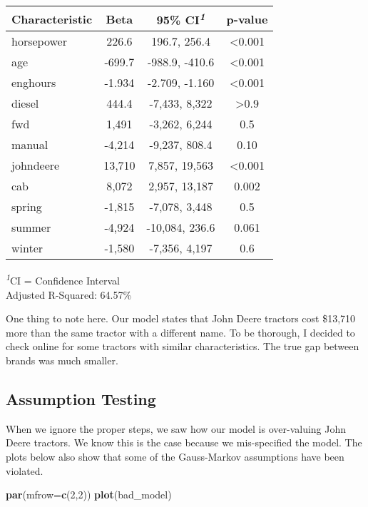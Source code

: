 \documentclass[
]{article}
\newenvironment{Shaded}{\begin{snugshade}}{\end{snugshade}}
\newcommand{\AttributeTok}[1]{\textcolor[rgb]{0.13,0.29,0.53}{#1}}
\newcommand{\DecValTok}[1]{\textcolor[rgb]{0.00,0.00,0.81}{#1}}
\newcommand{\FunctionTok}[1]{\textcolor[rgb]{0.13,0.29,0.53}{\textbf{#1}}}
\newcommand{\NormalTok}[1]{#1}
\begin{document}
\begingroup
\fontsize{12.0pt}{14.4pt}\selectfont
\setlength{\LTpost}{0mm}
\begin{longtable}{lccc}
\toprule
\textbf{Characteristic} & \textbf{Beta} & \textbf{95\% CI}\textsuperscript{\textit{1}} & \textbf{p-value} \\ 
\midrule\addlinespace[2.5pt]
horsepower & 226.6 & 196.7, 256.4 & <0.001 \\ 
age & -699.7 & -988.9, -410.6 & <0.001 \\ 
enghours & -1.934 & -2.709, -1.160 & <0.001 \\ 
diesel & 444.4 & -7,433, 8,322 & >0.9 \\ 
fwd & 1,491 & -3,262, 6,244 & 0.5 \\ 
manual & -4,214 & -9,237, 808.4 & 0.10 \\ 
johndeere & 13,710 & 7,857, 19,563 & <0.001 \\ 
cab & 8,072 & 2,957, 13,187 & 0.002 \\ 
spring & -1,815 & -7,078, 3,448 & 0.5 \\ 
summer & -4,924 & -10,084, 236.6 & 0.061 \\ 
winter & -1,580 & -7,356, 4,197 & 0.6 \\ 
\bottomrule
\end{longtable}
\begin{minipage}{\linewidth}
\textsuperscript{\textit{1}}CI = Confidence Interval\\
Adjusted R-Squared: 64.57\%\\
\end{minipage}
\endgroup

One thing to note here. Our model states that John Deere tractors cost
\$13,710 more than the same tractor with a different name. To be
thorough, I decided to check online for some tractors with similar
characteristics. The true gap between brands was much smaller.

\subsection{Assumption Testing}\label{assumption-testing}

When we ignore the proper steps, we saw how our model is over-valuing
John Deere tractors. We know this is the case because we mis-specified
the model. The plots below also show that some of the Gauss-Markov
assumptions have been violated.

\begin{Shaded}
\begin{Highlighting}[]
\FunctionTok{par}\NormalTok{(}\AttributeTok{mfrow=}\FunctionTok{c}\NormalTok{(}\DecValTok{2}\NormalTok{,}\DecValTok{2}\NormalTok{))}
\FunctionTok{plot}\NormalTok{(bad\_model)}
\end{Highlighting}
\end{Shaded}
\end{document}
